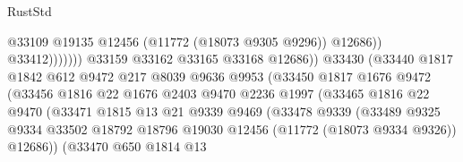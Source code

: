 \begin{lexlean}{RustStd}
\begin{coremodule}
                                                  @33109
                                                  @19135
                                                  @12456
                                                  (@11772 (@18073 @9305 @9296))
                                                  @12686))
                                              @33412)))))))
                                @33159
                                @33162
                                @33165
                                @33168
                                @12686))
                            @33430
                            (@33440
                              @1817
                              @1842
                              @612
                              @9472
                              @217
                              @8039
                              @9636
                              @9953
                              (@33450
                                @1817
                                @1676
                                @9472
                                (@33456
                                  @1816
                                  @22
                                  @1676
                                  @2403
                                  @9470
                                  @2236
                                  @1997
                                  (@33465
                                    @1816
                                    @22
                                    @9470
                                    (@33471
                                      @1815
                                      @13
                                      @21
                                      @9339
                                      @9469
                                      (@33478
                                        @9339
                                        (@33489
                                          @9325
                                          @9334
                                          @33502
                                          @18792
                                          @18796
                                          @19030
                                          @12456
                                          (@11772 (@18073 @9334 @9326))
                                          @12686))
                                      (@33470
                                        @650
                                        @1814
                                        @13

\end{coremodule}
\end{lexlean}
